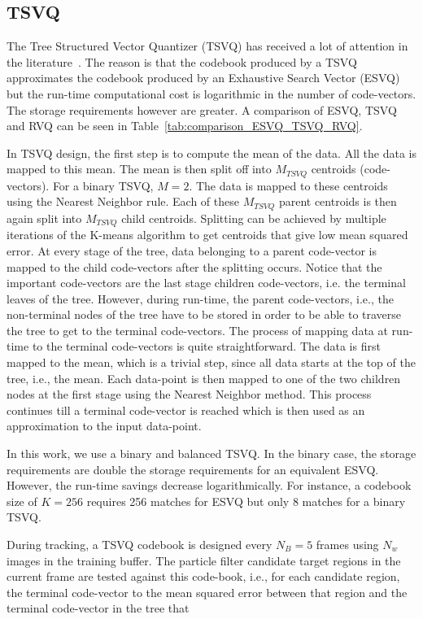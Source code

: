 \subsection{TSVQ}
The Tree Structured Vector Quantizer (TSVQ) has received a lot of attention in the literature~\cite{1991_BOOK_VQ_GershoGray}.  The reason is that the codebook produced by a TSVQ approximates the codebook produced by an Exhaustive Search Vector (ESVQ) but the run-time computational cost is logarithmic in the number of code-vectors.  The storage requirements however are greater.  A comparison of ESVQ, TSVQ and RVQ can be seen in Table~\ref{tab:comparison_ESVQ_TSVQ_RVQ}.

In TSVQ design, the first step is to compute the mean of the data.  All the data is mapped to this mean.  The mean is then split off into $M_{TSVQ}$ centroids (code-vectors).  For a binary TSVQ, $M=2$.  The data is mapped to these centroids using the Nearest Neighbor rule.  Each of these $M_{TSVQ}$ parent centroids is then again split into $M_{TSVQ}$ child centroids.  Splitting can be achieved by multiple iterations of the K-means algorithm to get centroids that give low mean squared error.  At every stage of the tree, data belonging to a parent code-vector is mapped to the child code-vectors after the splitting occurs.  Notice that the important code-vectors are the last stage children code-vectors, i.e. the terminal leaves of the tree.  However, during run-time, the parent code-vectors, i.e., the non-terminal nodes of the tree have to be stored in order to be able to traverse the tree to get to the terminal code-vectors.  The process of mapping data at run-time to the terminal code-vectors is quite straightforward.  The data is first mapped to the mean, which is a trivial step, since all data starts at the top of the tree, i.e., the mean.  Each data-point is then mapped to one of the two children nodes at the first stage using the Nearest Neighbor method.  This process continues till a terminal code-vector is reached which is then used as an approximation to the input data-point.

In this work, we use a binary and balanced TSVQ.  In the binary case, the storage requirements are double the storage requirements for an equivalent ESVQ.  However, the run-time savings decrease logarithmically.  For instance, a codebook size of $K=256$ requires 256 matches for ESVQ but only 8 matches for a binary TSVQ.  

During tracking, a TSVQ codebook is designed every $N_B=5$ frames using $N_w$ images in the training buffer.  The particle filter candidate target regions in the current frame are tested against this code-book, i.e., for each candidate region, the terminal code-vector  to the mean squared error between that region and the terminal code-vector in the tree that 


